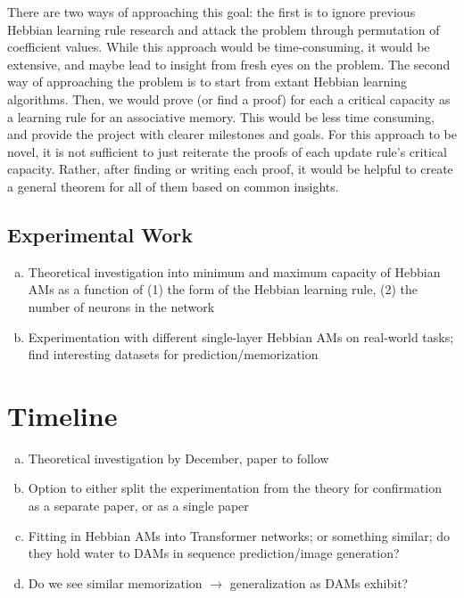 \documentclass{article}
\theoremstyle{definition}
\begin{document}
There are two ways of approaching this goal: the first is to ignore
previous Hebbian learning rule research and attack the problem through
permutation of coefficient values. While this approach would be time-consuming,
it would be extensive, and maybe lead to insight from fresh eyes on the problem.
The second way of approaching the problem is to start from extant Hebbian
learning algorithms. Then, we would prove (or find a proof)
for each a critical capacity as a learning rule for an associative memory. This
would be less time consuming, and provide the project with clearer milestones
and goals. For this approach to be novel, it is not sufficient to just
reiterate the proofs of each update rule's critical capacity. Rather,
after finding or writing each proof, it would be helpful to create a general
theorem for all of them based on common insights.

\subsection{Experimental Work}\label{subsec:experimental}

\begin{enumerate}[(a)]
  \item Theoretical investigation into minimum and maximum capacity
    of Hebbian AMs
    as a function of (1) the form of the Hebbian learning rule, (2)
    the number of neurons in the network
  \item Experimentation with different single-layer Hebbian AMs on
    real-world tasks;
    find interesting datasets for prediction/memorization
\end{enumerate}

\section{Timeline}

\begin{enumerate}[(a)]
  \item Theoretical investigation by December, paper to follow
  \item Option to either split the experimentation from the theory
    for confirmation as a separate
    paper, or as a single paper
  \item Fitting in Hebbian AMs into Transformer networks; or
    something similar; do they hold
    water to DAMs in sequence prediction/image generation?
  \item Do we see similar memorization $\to$ generalization as DAMs exhibit?
\end{enumerate}

\printbibliography
\end{document}
